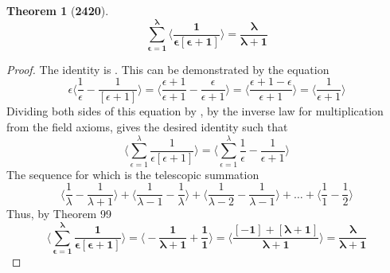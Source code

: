 \documentclass[preview]{standalone}
\newtheorem{theorem}{Theorem}
\begin{document}
\begin{theorem}[\textbf{2420}]
    \begin{equation*}
        \bm{
            \sum_{\epsilon=1}^\lambda 
                    \bigg \langle 
                        \frac{1}{\epsilon [ \epsilon + 1 ]}
                    \bigg \rangle
                = 
            \frac{\lambda}{\lambda + 1}
        }
    \end{equation*}
\end{theorem}

\begin{proof}
    The identity  is 
    . 
    This can be demonstrated by the equation
    \begin{equation*}
        \epsilon \bigg \langle \frac{1}{\epsilon} - \frac{1}{ [ \epsilon + 1 ] } \bigg \rangle 
            = 
        \bigg \langle \frac{\epsilon + 1}{\epsilon + 1} - \frac{\epsilon}{\epsilon + 1} \bigg \rangle
            = 
        \bigg \langle \frac{\epsilon + 1 - \epsilon}{\epsilon + 1} \bigg \rangle
            = 
        \bigg \langle \frac{1}{\epsilon + 1} \bigg \rangle
    \end{equation*}
    Dividing both sides of this equation by \bm{$\epsilon$},
    by the inverse law for multiplication from the field axioms,
    gives the desired identity such that
    \begin{equation*}
        \bigg \langle 
        \sum_{\epsilon=1}^\lambda 
                    \frac{1}{\epsilon [ \epsilon + 1 ]}
                \bigg \rangle 
            = 
        \bigg \langle 
        \sum_{\epsilon=1}^\lambda 
                    \frac{1}{\epsilon} - \frac{1}{\epsilon + 1} 
                \bigg \rangle
    \end{equation*}
    The sequence for which is the telescopic summation
    \begin{equation*}
        \bigg \langle \frac{1}{\lambda} - \frac{1}{\lambda + 1} \bigg \rangle
            + 
        \bigg \langle \frac{1}{\lambda - 1} - \frac{1}{\lambda} \bigg \rangle 
            + 
        \bigg \langle \frac{1}{\lambda - 2} - \frac{1}{\lambda - 1} \bigg \rangle
            + 
        \dots 
            + 
        \bigg \langle \frac{1}{1} - \frac{1}{2} \bigg \rangle
    \end{equation*}
    Thus, by Theorem 99
    \begin{equation*}
        \bm{
            \bigg \langle
            \sum_{\epsilon=1}^\lambda
                        \frac{1}{ \epsilon [ \epsilon + 1 ] } 
                    \bigg \rangle
                = 
            \bigg \langle -\frac{1}{\lambda + 1} + \frac{1}{1} \bigg \rangle 
                = 
            \bigg \langle \frac{ [ -1 ] + [ \lambda + 1 ] }{\lambda + 1} \bigg \rangle 
                = 
            \frac{\lambda}{\lambda+1}
        }
    \end{equation*}
\end{proof}
\end{document}
